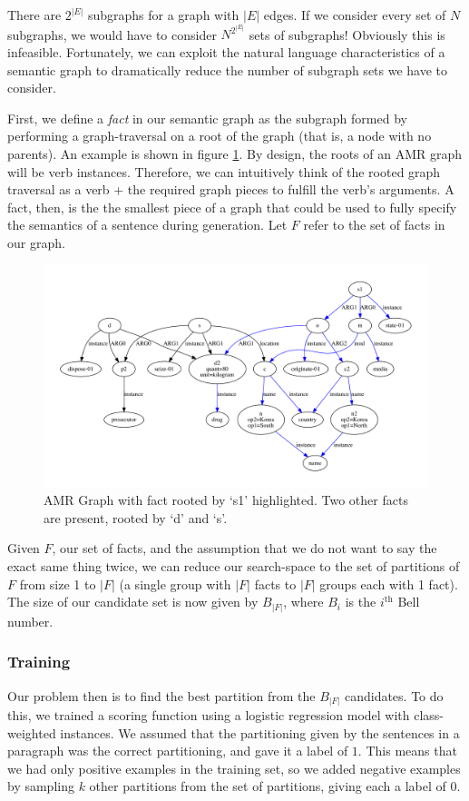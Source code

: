 \documentclass[12pt]{article}
\begin{document}
There are $2^{|E|}$ subgraphs for a graph with $|E|$ edges. If we consider every set of $N$ subgraphs, we would have to consider $N^{2^{|E|}}$ sets of subgraphs! Obviously this is infeasible. Fortunately, we can exploit the natural language characteristics of a semantic graph to dramatically reduce the number of subgraph sets we have to consider. 

First, we define a {\em fact} in our semantic graph as the subgraph formed by performing a graph-traversal on a root of the graph (that is, a node with no parents). An example is shown in figure \ref{fig:amr_example_3_merged_s1_highlighted}. By design, the roots of an AMR graph will be verb instances. Therefore, we can intuitively think of the rooted graph traversal as a verb + the required graph pieces to fulfill the verb's arguments. A fact, then, is the the smallest piece of a graph that could be used to fully specify the semantics of a sentence during generation. Let $F$ refer to the set of facts in our graph.

\begin{figure}
\includegraphics[width=\linewidth]{amr_example_3_merged_s1_highlighted.pdf}
\caption{AMR Graph with fact rooted by `s1' highlighted. Two other facts are present, rooted by `d' and `s'.}
\label{fig:amr_example_3_merged_s1_highlighted}
\end{figure}

Given $F$, our set of facts, and the assumption that we do not want to say the exact same thing twice, we can reduce our search-space to the set of partitions of $F$ from size 1 to $|F|$ (a single group with $|F|$ facts to $|F|$ groups each with 1 fact). The size of our candidate set is now given by $B_{|F|}$, where $B_i$ is the $i^{\text{th}}$ Bell number.

\subsubsection{Training}
Our problem then is to find the best partition from the $B_{|F|}$ candidates. To do this, we trained a scoring function using a logistic regression model with class-weighted instances. We assumed that the partitioning given by the sentences in a paragraph was the correct partitioning, and gave it a label of $1$. This means that we had only positive examples in the training set, so we added negative examples by sampling $k$ other partitions from the set of partitions, giving each a label of $0$.
\end{document}
